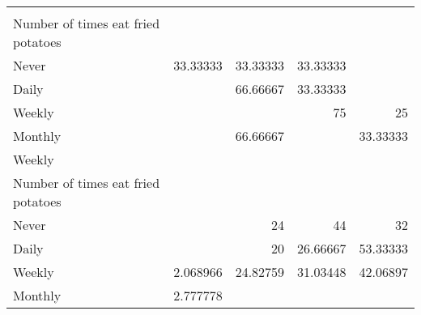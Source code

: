 \documentclass{article}
\begin{document}
\begin{tabular}{lllll}
  \multicolumn{1}{r}{} &
  \multicolumn{1}{r}{} &
  \multicolumn{1}{r}{} \\
\multicolumn{1}{l}{\hspace{4em}Number of times eat fried potatoes} &
  \multicolumn{1}{|r}{} &
  \multicolumn{1}{r}{} &
  \multicolumn{1}{r}{} &
  \multicolumn{1}{r}{} \\
\multicolumn{1}{l}{\hspace{5em}Never} &
  \multicolumn{1}{|r}{33.33333} &
  \multicolumn{1}{r}{33.33333} &
  \multicolumn{1}{r}{33.33333} &
  \multicolumn{1}{r}{} \\
\multicolumn{1}{l}{\hspace{5em}Daily} &
  \multicolumn{1}{|r}{} &
  \multicolumn{1}{r}{66.66667} &
  \multicolumn{1}{r}{33.33333} &
  \multicolumn{1}{r}{} \\
\multicolumn{1}{l}{\hspace{5em}Weekly} &
  \multicolumn{1}{|r}{} &
  \multicolumn{1}{r}{} &
  \multicolumn{1}{r}{75} &
  \multicolumn{1}{r}{25} \\
\multicolumn{1}{l}{\hspace{5em}Monthly} &
  \multicolumn{1}{|r}{} &
  \multicolumn{1}{r}{66.66667} &
  \multicolumn{1}{r}{} &
  \multicolumn{1}{r}{33.33333} \\
\multicolumn{1}{l}{\hspace{3em}Weekly} &
  \multicolumn{1}{|r}{} &
  \multicolumn{1}{r}{} &
  \multicolumn{1}{r}{} &
  \multicolumn{1}{r}{} \\
\multicolumn{1}{l}{\hspace{4em}Number of times eat fried potatoes} &
  \multicolumn{1}{|r}{} &
  \multicolumn{1}{r}{} &
  \multicolumn{1}{r}{} &
  \multicolumn{1}{r}{} \\
\multicolumn{1}{l}{\hspace{5em}Never} &
  \multicolumn{1}{|r}{} &
  \multicolumn{1}{r}{24} &
  \multicolumn{1}{r}{44} &
  \multicolumn{1}{r}{32} \\
\multicolumn{1}{l}{\hspace{5em}Daily} &
  \multicolumn{1}{|r}{} &
  \multicolumn{1}{r}{20} &
  \multicolumn{1}{r}{26.66667} &
  \multicolumn{1}{r}{53.33333} \\
\multicolumn{1}{l}{\hspace{5em}Weekly} &
  \multicolumn{1}{|r}{2.068966} &
  \multicolumn{1}{r}{24.82759} &
  \multicolumn{1}{r}{31.03448} &
  \multicolumn{1}{r}{42.06897} \\
\multicolumn{1}{l}{\hspace{5em}Monthly} &
  \multicolumn{1}{|r}{2.777778} &

\end{tabular}
\end{document}
